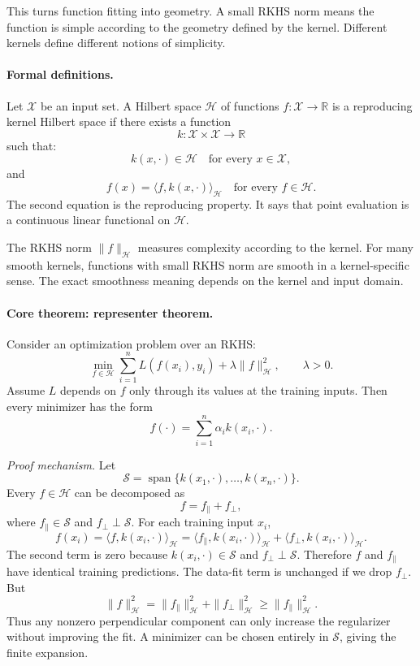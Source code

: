 This turns function fitting into geometry. A small RKHS norm means the function is simple according to the geometry defined by the kernel. Different kernels define different notions of simplicity.

\paragraph{Formal definitions.}
Let \(\mathcal X\) be an input set. A Hilbert space \(\mathcal H\) of functions \(f:\mathcal X\to\mathbb R\) is a reproducing kernel Hilbert space if there exists a function
\[
k:\mathcal X\times\mathcal X\to\mathbb R
\]
such that:
\[
k(x,\cdot)\in\mathcal H\quad\text{for every }x\in\mathcal X,
\]
and
\[
\boxed{
f(x)=\langle f,k(x,\cdot)\rangle_{\mathcal H}
\quad\text{for every }f\in\mathcal H.
}
\]
The second equation is the reproducing property. It says that point evaluation is a continuous linear functional on \(\mathcal H\).

The RKHS norm \(\|f\|_{\mathcal H}\) measures complexity according to the kernel. For many smooth kernels, functions with small RKHS norm are smooth in a kernel-specific sense. The exact smoothness meaning depends on the kernel and input domain.

\paragraph{Core theorem: representer theorem.}
Consider an optimization problem over an RKHS:
\[
\min_{f\in\mathcal H}
\sum_{i=1}^n L(f(x_i),y_i)
+\lambda\|f\|_{\mathcal H}^2,
\qquad \lambda>0.
\]
Assume \(L\) depends on \(f\) only through its values at the training inputs. Then every minimizer has the form
\[
\boxed{
f(\cdot)=\sum_{i=1}^n \alpha_i k(x_i,\cdot).
}
\]

\emph{Proof mechanism.} Let
\[
\mathcal S=\operatorname{span}\{k(x_1,\cdot),\ldots,k(x_n,\cdot)\}.
\]
Every \(f\in\mathcal H\) can be decomposed as
\[
f=f_{\parallel}+f_{\perp},
\]
where \(f_{\parallel}\in\mathcal S\) and \(f_{\perp}\perp\mathcal S\). For each training input \(x_i\),
\[
f(x_i)=\langle f,k(x_i,\cdot)\rangle_{\mathcal H}
=\langle f_{\parallel},k(x_i,\cdot)\rangle_{\mathcal H}
+\langle f_{\perp},k(x_i,\cdot)\rangle_{\mathcal H}.
\]
The second term is zero because \(k(x_i,\cdot)\in\mathcal S\) and \(f_{\perp}\perp\mathcal S\). Therefore \(f\) and \(f_{\parallel}\) have identical training predictions. The data-fit term is unchanged if we drop \(f_{\perp}\). But
\[
\|f\|_{\mathcal H}^2
=\|f_{\parallel}\|_{\mathcal H}^2+\|f_{\perp}\|_{\mathcal H}^2
\geq \|f_{\parallel}\|_{\mathcal H}^2.
\]
Thus any nonzero perpendicular component can only increase the regularizer without improving the fit. A minimizer can be chosen entirely in \(\mathcal S\), giving the finite expansion.

